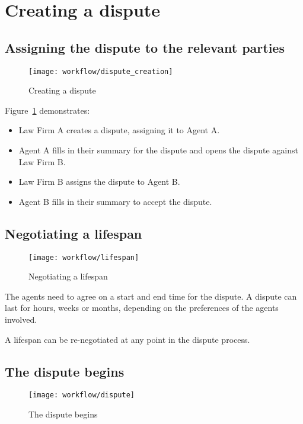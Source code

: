 \section{Creating a dispute}

\subsection{Assigning the dispute to the relevant parties}

\begin{figure}[ht!]
  \centering
    \ifimages
    \texttt{[image: workflow/dispute\_creation]}
    \fi
    \caption{Creating a dispute}
  \label{workflow:disputeCreation}
\end{figure}

Figure~\ref{workflow:disputeCreation} demonstrates:

\begin{itemize}
\item Law Firm A creates a dispute, assigning it to Agent A.
\item Agent A fills in their summary for the dispute and opens the dispute against Law Firm B.
\item Law Firm B assigns the dispute to Agent B.
\item Agent B fills in their summary to accept the dispute.
\end{itemize}

\subsection{Negotiating a lifespan}

\begin{figure}[ht!]
  \centering
    \ifimages
    \texttt{[image: workflow/lifespan]}
    \fi
    \caption{Negotiating a lifespan}
  \label{workflow:lifespan}
\end{figure}

The agents need to agree on a start and end time for the dispute. A dispute can last for hours, weeks or months, depending on the preferences of the agents involved.

A lifespan can be re-negotiated at any point in the dispute process.

\subsection{The dispute begins}

\begin{figure}[ht!]
  \centering
    \ifimages
    \texttt{[image: workflow/dispute]}
    \fi
    \caption{The dispute begins}
  \label{workflow:dispute}
\end{figure}

